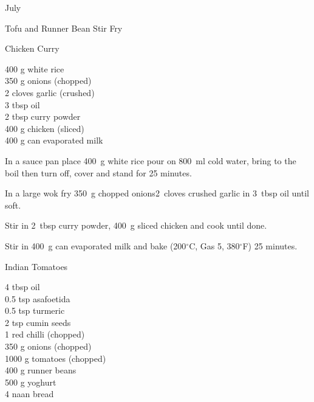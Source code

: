 \begin{menu}{July}
\begin{recipe}{2}{Tofu and Runner Bean Stir Fry}
\begin{instructions}
    \end{instructions}
    \end{recipe}%
  
    \begin{recipe}{2}{Chicken Curry}%
		\begin{ingredients}
		400 g white rice  \\
	350 g onions (chopped) \\
	2 cloves garlic (crushed) \\
	3 tbsp oil  \\
	2 tbsp curry powder  \\
	400 g chicken (sliced) \\
	400 g can evaporated milk  \\
	
		\end{ingredients}
	
	
    \begin{instructions}
    \item 
      In a
      sauce pan
      place
      400~g  white rice
      pour on
      800~ml  cold water,
      bring to the boil then turn off, cover and stand for 25 minutes.
    \item 
        In a large wok fry
        350~g chopped onions2~cloves crushed garlic
        in
        3~tbsp  oil
        until soft.
      \item 
        Stir in
        2~tbsp  curry powder,
        400~g sliced chicken
        and cook until done.
      \item 
        Stir in
        400~g  can evaporated milk
        and
        bake (200$^{\circ}$C, Gas 5, 380$^{\circ}$F) 25 minutes.
      
    \end{instructions}
    \end{recipe}%
  
    \begin{recipe}{2}{Indian Tomatoes}%
		\begin{ingredients}
		4 tbsp oil  \\
	0.5 tsp asafoetida  \\
	0.5 tsp turmeric  \\
	2 tsp cumin seeds  \\
	1  red chilli (chopped) \\
	350 g onions (chopped) \\
	1000 g tomatoes (chopped) \\
	400 g runner beans  \\
	500 g yoghurt  \\
	4  naan bread  \\
	

\end{ingredients}
\end{recipe}
\end{menu}
